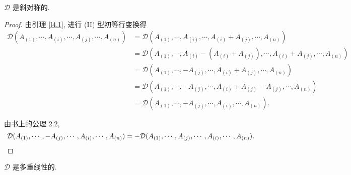 \documentclass{ctexart}
\begin{document}
\begin{theorem}[书上的公理 1.1]
    $\mathcal{D}$ 是斜对称的.
\end{theorem}
\begin{proof}
    由引理 \ref{l4.1}, 进行 (II) 型初等行变换得
    \begin{align*}
        \mathcal{D}(A_{(1)},\cdots,A_{(i)},\cdots,A_{(j)},\cdots,A_{(n)}) & =\mathcal{D}(A_{(1)},\cdots,A_{(i)},\cdots,A_{(i)}+A_{(j)},\cdots,A_{(n)}) \\
        & =\mathcal{D}(A_{(1)},\cdots,A_{(i)}-(A_{(i)}+A_{(j)}),\cdots,A_{(i)}+A_{(j)},\cdots,A_{(n)}) \\
        & =\mathcal{D}(A_{(1)},\cdots,-A_{(j)},\cdots,A_{(i)}+A_{(j)},\cdots,A_{(n)}) \\
        & =\mathcal{D}(A_{(1)},\cdots,-A_{(j)},\cdots,A_{(i)}+A_{(j)}-A_{(j)},\cdots,A_{(n)}) \\
        & =\mathcal{D}(A_{(1)},\cdots,-A_{(j)},\cdots,A_{(i)},\cdots,A_{(n)}).
    \end{align*}

    由书上的公理 2.2,
    \[\mathcal{D}(A_{(1)},\cdots,-A_{(j)},\cdots,A_{(i)},\cdots,A_{(n)})=-\mathcal{D}(A_{(1)},\cdots,A_{(j)},\cdots,A_{(i)},\cdots,A_{(n)}).\qedhere\]
\end{proof}
\begin{theorem}[书上的公理 1.2]
    $\mathcal{D}$ 是多重线性的.
\end{theorem}
\end{document}
